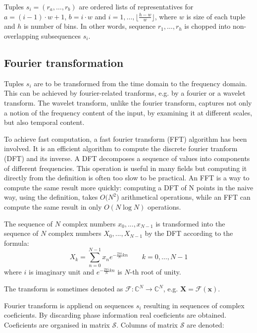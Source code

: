 \documentclass[a4paper,journal]{IEEEtran}
\begin{document}
Tuples $s_i = (r_a, \ldots, r_b)$ are ordered lists of representatives for
$a = (i-1)\cdot w +1 $, $b = i\cdot w $ and $ i = 1, \ldots, \lfloor \frac{h-w}{w} \rfloor$,
where $w$ is size of each tuple and $h$ is number of bins. In other words, sequence $r_1,\ldots,r_h$
is chopped into non-overlapping subsequences $s_i$.



\subsection{Fourier transformation}
Tuples $s_i$ are to be transformed from the time domain to the frequency domain.
This can be achieved by fourier-related tranforms, e.g. by a fourier or a wavelet transform.
The wavelet transform, unlike the fourier transform, captures
not only a notion of the frequency content of the input, by
examining it at different scales, but also temporal content.

To achieve fast computation, a fast fourier transform (FFT) algorithm has been involved.
It is an efficient algorithm to compute the discrete fourier tranform (DFT) and its inverse.
A DFT decomposes a sequence of values into components of different frequencies. 
This operation is useful in many fields but computing it directly from the definition is often 
too slow to be practical.
An FFT is a way to compute the same result more quickly: 
computing a DFT of N points in the naive way, using the definition, takes $O(N^2$) arithmetical 
operations, while an FFT can compute the same result in only $ O(N \log N)$ operations.

The sequence of $N$ complex numbers $x_0, ..., x_{N−1}$ is transformed into the
sequence of $N$ complex numbers $X_0, ..., X_{N−1}$ by the DFT according to the
formula:
\begin{equation}
X_k = \sum_{n=0}^{N-1} x_n e^{-\frac{2 \pi i}{N} k n} \quad \quad k = 0, \dots, N-1
\end{equation}
where $i$ is imaginary unit and $e^{-\frac{2 \pi i}{N} k n}$ is $N$-th root of unity.

The transform is sometimes denoted as 
$\mathcal{F}\colon\mathbb{C}^N \to \mathbb{C}^N$, e.g.
$\mathbf{X} = \mathcal{F} \left ( \mathbf{x} \right )$.

Fourier transform is appliend on sequences $s_i$ resulting in sequences of complex coeficients.
By discarding phase information real coeficients are obtained.
Coeficients are organised in matrix $\mathcal{S}$. Columns of matrix $\mathcal{S}$ are denoted:
\end{document}
